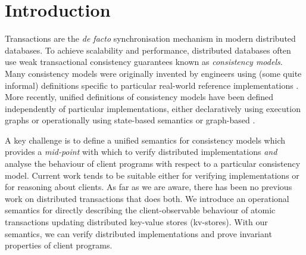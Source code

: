 \section{Introduction}
\label{sec:intro}

Transactions are the \emph{de facto} synchronisation mechanism in
modern distributed databases.  To achieve scalability and performance,
distributed databases often use {weak}  transactional consistency
guarantees known as \emph{consistency models}.  Many consistency
models were originally invented by engineers using (some quite
informal) definitions specific to particular real-world reference
implementations
\cite{gdur,ramp,CORFU,tango,si,distrsi,clocksi,redblue,rola,cops,PSI-RA,NMSI,PSI,wren}.
More recently, unified definitions of consistency models have been
defined independently of particular implementations, either
declaratively using execution graphs \cite{adya,ev_transactions} or
operationally using state-based semantics or graph-based \cite{seebelieve,alonetogether,sureshConcur}.


A key challenge is to define a unified semantics for consistency
models which provides  a {\em mid-point}  with which to 
verify distributed implementations {\em and} analyse the
behaviour of client programs with respect to a particular consistency model. Current
work tends to be suitable  either for verifying implementations or for reasoning
about
clients. As far as we are aware, there has been no
previous work on distributed transactions that does both. 
We introduce an operational semantics for directly describing the
client-observable behaviour of atomic transactions 
updating distributed key-value stores (kv-stores). With our semantics, we can verify distributed implementations and prove
invariant properties of client programs.  




